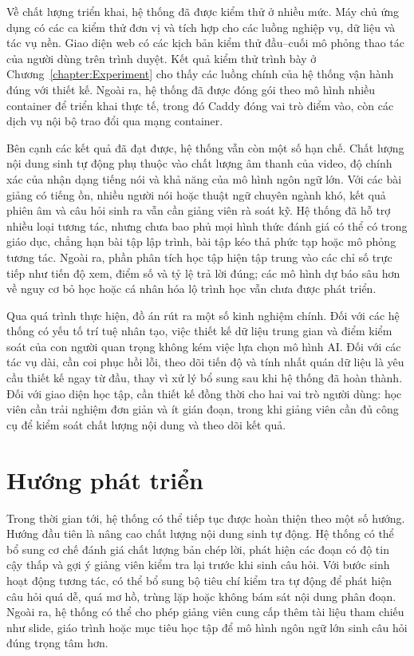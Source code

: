 \documentclass[../DoAn.tex]{subfiles}
\begin{document}
Về chất lượng triển khai, hệ thống đã được kiểm thử ở nhiều mức. Máy chủ ứng dụng có các ca kiểm thử đơn vị và tích hợp cho các luồng nghiệp vụ, dữ liệu và tác vụ nền. Giao diện web có các kịch bản kiểm thử đầu--cuối mô phỏng thao tác của người dùng trên trình duyệt. Kết quả kiểm thử trình bày ở Chương~\ref{chapter:Experiment} cho thấy các luồng chính của hệ thống vận hành đúng với thiết kế. Ngoài ra, hệ thống đã được đóng gói theo mô hình nhiều container để triển khai thực tế, trong đó Caddy đóng vai trò điểm vào, còn các dịch vụ nội bộ trao đổi qua mạng container.

Bên cạnh các kết quả đã đạt được, hệ thống vẫn còn một số hạn chế. Chất lượng nội dung sinh tự động phụ thuộc vào chất lượng âm thanh của video, độ chính xác của nhận dạng tiếng nói và khả năng của mô hình ngôn ngữ lớn. Với các bài giảng có tiếng ồn, nhiều người nói hoặc thuật ngữ chuyên ngành khó, kết quả phiên âm và câu hỏi sinh ra vẫn cần giảng viên rà soát kỹ. Hệ thống đã hỗ trợ nhiều loại tương tác, nhưng chưa bao phủ mọi hình thức đánh giá có thể có trong giáo dục, chẳng hạn bài tập lập trình, bài tập kéo thả phức tạp hoặc mô phỏng tương tác. Ngoài ra, phần phân tích học tập hiện tập trung vào các chỉ số trực tiếp như tiến độ xem, điểm số và tỷ lệ trả lời đúng; các mô hình dự báo sâu hơn về nguy cơ bỏ học hoặc cá nhân hóa lộ trình học vẫn chưa được phát triển.

Qua quá trình thực hiện, đồ án rút ra một số kinh nghiệm chính. Đối với các hệ thống có yếu tố trí tuệ nhân tạo, việc thiết kế dữ liệu trung gian và điểm kiểm soát của con người quan trọng không kém việc lựa chọn mô hình AI. Đối với các tác vụ dài, cần coi phục hồi lỗi, theo dõi tiến độ và tính nhất quán dữ liệu là yêu cầu thiết kế ngay từ đầu, thay vì xử lý bổ sung sau khi hệ thống đã hoàn thành. Đối với giao diện học tập, cần thiết kế đồng thời cho hai vai trò người dùng: học viên cần trải nghiệm đơn giản và ít gián đoạn, trong khi giảng viên cần đủ công cụ để kiểm soát chất lượng nội dung và theo dõi kết quả.

\section{Hướng phát triển}
Trong thời gian tới, hệ thống có thể tiếp tục được hoàn thiện theo một số hướng. Hướng đầu tiên là nâng cao chất lượng nội dung sinh tự động. Hệ thống có thể bổ sung cơ chế đánh giá chất lượng bản chép lời, phát hiện các đoạn có độ tin cậy thấp và gợi ý giảng viên kiểm tra lại trước khi sinh câu hỏi. Với bước sinh hoạt động tương tác, có thể bổ sung bộ tiêu chí kiểm tra tự động để phát hiện câu hỏi quá dễ, quá mơ hồ, trùng lặp hoặc không bám sát nội dung phân đoạn. Ngoài ra, hệ thống có thể cho phép giảng viên cung cấp thêm tài liệu tham chiếu như slide, giáo trình hoặc mục tiêu học tập để mô hình ngôn ngữ lớn sinh câu hỏi đúng trọng tâm hơn.
\end{document}

